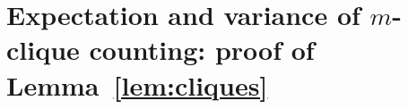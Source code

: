 \documentclass[final]{colt2026}
\newcommand{\1}{\mathbf{1}}
\newcommand{\ch}[1]{\textcolor{green}{#1}}
\newcommand{\bbP}{\mathbb{P}}
\newcommand{\pa}[1]{\left(#1\right)}
\newcommand{\ac}[1]{\left\{#1\right\}}
\newcommand{\cro}[1]{\left[#1\right]}
\begin{document}
\section{Expectation and variance of $m$-clique counting: proof of Lemma~\ref{lem:cliques}}\label{sec:S}

%
%
%
%
\end{document}
